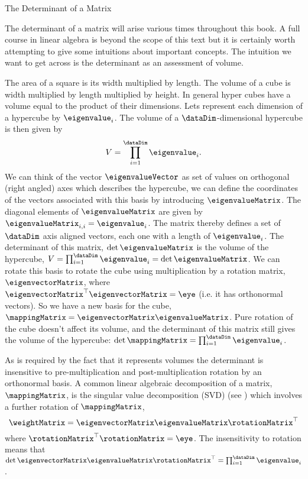 \begin{boxfloat}
  \caption{The Determinant of a Matrix}\label{box:determinant}

  \boxfontsize The determinant of a matrix will arise various times
  throughout this book. A full course in linear algebra is beyond the
  scope of this text but it is certainly worth attempting to give some
  intuitions about important concepts. The intuition we want to get
  across is the determinant as an assessment of volume.

  The area of a square is its width multiplied by length. The volume of
  a cube is width multiplied by length multiplied by height. In general
  hyper cubes have a volume equal to the product of their
  dimensions. Lets represent each dimension of a hypercube by
  $\eigenvalue_i$. The volume of a $\dataDim$-dimensional hypercube is
  then given by
  \[
  V = \prod_{i=1}^\dataDim \eigenvalue_i.
  \]
  We can think of the vector $\eigenvalueVector$ as set of values on
  orthogonal (right angled) axes which describes the hypercube, we can
  define the coordinates of the vectors associated with this basis by
  introducing $\eigenvalueMatrix$. The diagonal elements of
  $\eigenvalueMatrix$ are given by $\eigenvalueMatrix_{i, i}
  =\eigenvalue_i$. The matrix thereby defines a set of $\dataDim$ axis
  aligned vectors, each one with a length of $\eigenvalue_i$. The
  determinant of this matrix, $\det{\eigenvalueMatrix}$ is the volume
  of the hypercube, $V=\prod_{i=1}^\dataDim \eigenvalue_i =
  \det{\eigenvalueMatrix}$. We can rotate this basis to rotate the
  cube using multiplication by a rotation matrix,
  $\eigenvectorMatrix$, where $\eigenvectorMatrix^\top
  \eigenvectorMatrix = \eye$ (i.e. it has orthonormal vectors). So we
  have a new basis for the cube, $\mappingMatrix=\eigenvectorMatrix
  \eigenvalueMatrix$. Pure rotation of the cube doesn't affect its
  volume, and the determinant of this matrix still gives the volume of
  the hypercube: $\det{\mappingMatrix}=\prod_{i=1}^\dataDim
  \eigenvalue_i$.

  As is required by the fact that it represents volumes the
  determinant is insensitive to pre-multiplication and
  post-multiplication rotation by an orthonormal basis. A common
  linear algebraic decomposition of a matrix, $\mappingMatrix$, is the
  singular value decomposition (SVD) (see ) which involves a further
  rotation of $\mappingMatrix$,
  \[
  \weightMatrix = \eigenvectorMatrix \eigenvalueMatrix
  \rotationMatrix^\top
  \]
  where $\rotationMatrix^\top\rotationMatrix=\eye$. The insensitivity to
  rotation means that $\det{\eigenvectorMatrix \eigenvalueMatrix
    \rotationMatrix^\top}=\prod_{i=1}^\dataDim\eigenvalue_i$. 


\end{boxfloat}
